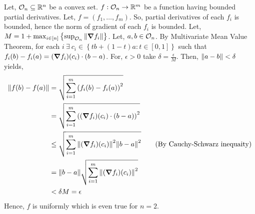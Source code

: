 \begin{soln}{2}
   Let, $ \mathcal{O}_n \subseteq \mathbb{R}^n $ be a convex set. $ f:\mathcal{O}_n \to \mathbb{R}^m $ be a \diff function having bounded partial derivatives. Let, $ f = (f_1,\ldots,f_m) $. So, partial derivatives of each $ f_i $ is bounded, hence the norm of gradient of each $ f_i $ is bounded. Let, $ M = 1+\max_{i\in [n]}\left\{ \sup_{\mathcal{O}_n} \norm{\grad f_i} \right\}$. Let, $ a,b \in \mathcal{O}_n $.  By Multivariate Mean Value Theorem, for each $i \ \exists \: c_i \in \left\{ tb+(1-t)a : t \in [0,1] \right\} $ such that $ f_i(b) - f_i(a) = (\grad f_i)(c_i) \cdot (b-a) $. For, $ \epsilon > 0 $ take $ \delta = \frac{\epsilon}{M} $. Then, $ \norm{a-b} < \delta $ yields,
   \begin{align*}
    \norm{f(b)-f(a)}
    &= \sqrt{\sum_{i=1}^{m}\left( f_i(b)-f_i(a) \right)^2} \\ 
    &= \sqrt{\sum_{i=1}^{m}\left( (\grad f_i)(c_i) \cdot (b-a) \right)^2} \\ 
    &\leq \sqrt{\sum_{i=1}^{m}\norm{(\grad f_i)(c_i)}^2\norm{b-a}^2} \tag{By Cauchy-Schwarz inequaity} \\ 
    &= \norm{b-a}\sqrt{\sum_{i=1}^{m}\norm{(\grad f_i)(c_i)}^2} \\ 
    &< \delta M = \epsilon
   \end{align*}
   Hence, $ f $ is uniformly \cts which is even true for $ n=2 $.
\end{soln}